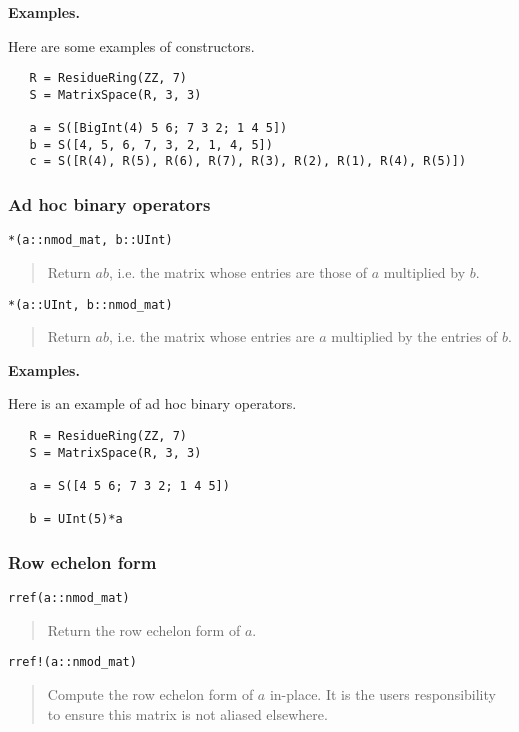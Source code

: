 \documentclass[a4paper,10pt]{article}
\newcommand{\desc}[1]{\vspace{-3mm}\begin{quote}#1\end{quote}}
\begin{document}
{{\textbf{Examples.}

Here are some examples of constructors.

\begin{lstlisting}
   R = ResidueRing(ZZ, 7)
   S = MatrixSpace(R, 3, 3)

   a = S([BigInt(4) 5 6; 7 3 2; 1 4 5])
   b = S([4, 5, 6, 7, 3, 2, 1, 4, 5])
   c = S([R(4), R(5), R(6), R(7), R(3), R(2), R(1), R(4), R(5)])
\end{lstlisting}

\subsubsection{Ad hoc binary operators}

\begin{lstlisting}
*(a::nmod_mat, b::UInt)
\end{lstlisting}

\desc{Return $ab$, i.e. the matrix whose entries are those of $a$ multiplied by $b$.}

\begin{lstlisting}
*(a::UInt, b::nmod_mat)
\end{lstlisting}

\desc{Return $ab$, i.e. the matrix whose entries are $a$ multiplied by the entries
of $b$.}

\textbf{Examples.}

Here is an example of ad hoc binary operators.

\begin{lstlisting}
   R = ResidueRing(ZZ, 7)
   S = MatrixSpace(R, 3, 3)

   a = S([4 5 6; 7 3 2; 1 4 5])

   b = UInt(5)*a
\end{lstlisting}

\subsubsection{Row echelon form}

\begin{lstlisting}
rref(a::nmod_mat)
\end{lstlisting}

\desc{Return the row echelon form of $a$.}

\begin{lstlisting}
rref!(a::nmod_mat)
\end{lstlisting}

\desc{Compute the row echelon form of $a$ in-place. It is the users responsibility
to ensure this matrix is not aliased elsewhere.}

}}
\end{document}
